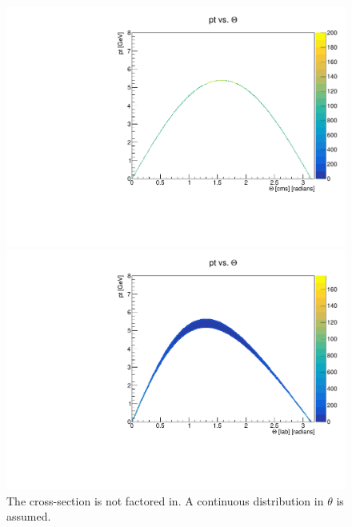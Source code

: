 \documentclass[a4paper,11pt,twosided,final,german,openbib,pdftex,listof=totoc,bibliography=totoc]{scrbook}
\begin{document}
\begin{figure}[h!]
	\centering
	\begin{minipage}[b]{0.45\linewidth}
		\centering
		\includegraphics[width=\textwidth]{Bilder/ptTheta_CMS}
	\end{minipage}
	\hspace{0.5cm}
	\begin{minipage}[b]{0.45\linewidth}
		\centering
		\includegraphics[width=\textwidth]{Bilder/ptTheta}
	\end{minipage}
	\caption[$\theta$-pt-Distribution In The CMS And LAB Frame]{The cross-section is not factored in. A continuous distribution in $\theta$ is assumed.}
	
\end{figure}
\end{document}

